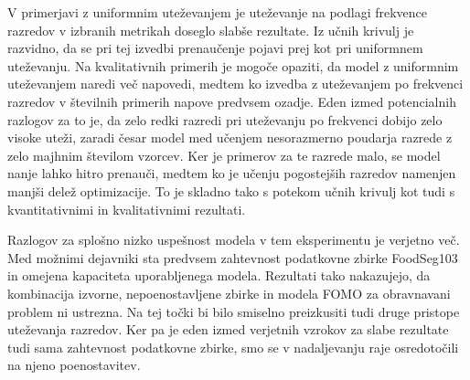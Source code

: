 \documentclass[a4paper,twoside,openright,12pt,slovene]{book}
\begin{document}
            V primerjavi z uniformnim uteževanjem je uteževanje na podlagi
            frekvence razredov v izbranih metrikah doseglo slabše rezultate. Iz
            učnih krivulj je razvidno, da se pri tej izvedbi prenaučenje pojavi
            prej kot pri uniformnem uteževanju. Na kvalitativnih primerih je
            mogoče opaziti, da model z uniformnim uteževanjem naredi več
            napovedi, medtem ko izvedba z uteževanjem po frekvenci razredov v
            številnih primerih napove predvsem ozadje.
            Eden izmed potencialnih razlogov za to je, da zelo redki razredi
            pri uteževanju po frekvenci dobijo zelo visoke uteži, zaradi česar
            model med učenjem nesorazmerno poudarja razrede z zelo majhnim
            številom vzorcev. Ker je primerov za te razrede malo, se model
            nanje lahko hitro prenauči, medtem ko je učenju pogostejših
            razredov namenjen manjši delež optimizacije. To je skladno tako s
            potekom učnih krivulj kot tudi s kvantitativnimi in kvalitativnimi
            rezultati.

            Razlogov za splošno nizko uspešnost modela v tem eksperimentu je
            verjetno več. Med možnimi dejavniki sta predvsem zahtevnost
            podatkovne zbirke FoodSeg103 in omejena kapaciteta uporabljenega
            modela. Rezultati tako nakazujejo, da kombinacija izvorne,
            nepoenostavljene zbirke in modela FOMO za obravnavani problem ni
            ustrezna.
            Na tej točki bi bilo smiselno preizkusiti tudi druge pristope
            uteževanja razredov. Ker pa je eden izmed verjetnih vzrokov za
            slabe rezultate tudi sama zahtevnost podatkovne zbirke, smo se v
            nadaljevanju raje osredotočili na njeno poenostavitev.



\end{document}

